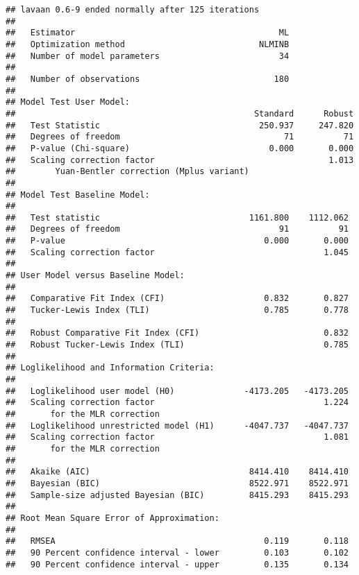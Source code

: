 \documentclass[
  english,
  man]{apa6}
\begin{document}
\begin{verbatim}
## lavaan 0.6-9 ended normally after 125 iterations
## 
##   Estimator                                         ML
##   Optimization method                           NLMINB
##   Number of model parameters                        34
##                                                       
##   Number of observations                           180
##                                                       
## Model Test User Model:
##                                                Standard      Robust
##   Test Statistic                                250.937     247.820
##   Degrees of freedom                                 71          71
##   P-value (Chi-square)                            0.000       0.000
##   Scaling correction factor                                   1.013
##        Yuan-Bentler correction (Mplus variant)                     
## 
## Model Test Baseline Model:
## 
##   Test statistic                              1161.800    1112.062
##   Degrees of freedom                                91          91
##   P-value                                        0.000       0.000
##   Scaling correction factor                                  1.045
## 
## User Model versus Baseline Model:
## 
##   Comparative Fit Index (CFI)                    0.832       0.827
##   Tucker-Lewis Index (TLI)                       0.785       0.778
##                                                                   
##   Robust Comparative Fit Index (CFI)                         0.832
##   Robust Tucker-Lewis Index (TLI)                            0.785
## 
## Loglikelihood and Information Criteria:
## 
##   Loglikelihood user model (H0)              -4173.205   -4173.205
##   Scaling correction factor                                  1.224
##       for the MLR correction                                      
##   Loglikelihood unrestricted model (H1)      -4047.737   -4047.737
##   Scaling correction factor                                  1.081
##       for the MLR correction                                      
##                                                                   
##   Akaike (AIC)                                8414.410    8414.410
##   Bayesian (BIC)                              8522.971    8522.971
##   Sample-size adjusted Bayesian (BIC)         8415.293    8415.293
## 
## Root Mean Square Error of Approximation:
## 
##   RMSEA                                          0.119       0.118
##   90 Percent confidence interval - lower         0.103       0.102
##   90 Percent confidence interval - upper         0.135       0.134

\end{verbatim}
\end{document}
